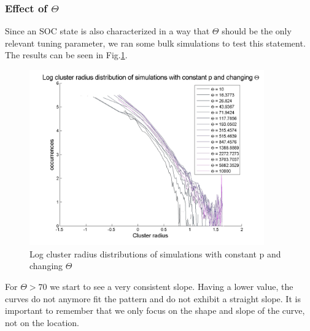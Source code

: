 \documentclass[11pt]{article}
\begin{document}
\subsubsection{Effect of $\Theta$}
Since an SOC state is also characterized in a way that $\Theta$ should be the only relevant tuning parameter, we ran some bulk simulations to test this statement. The results can be seen in Fig.\ref{varthetaconstp}.
\begin{figure}[H]
\includegraphics[width=0.9\textwidth,keepaspectratio=true]{Pictures/constpvartheta2.jpg}
\caption{Log cluster radius distributions of simulations with constant p and changing $\Theta$}
\label{varthetaconstp}
\end{figure}
For $\Theta > 70$ we start to see a very consistent slope. Having a lower value, the curves do not anymore fit the pattern and do not exhibit a straight slope. It is important to remember that we only focus on the shape and slope of the curve, not on the location.
\end{document}
